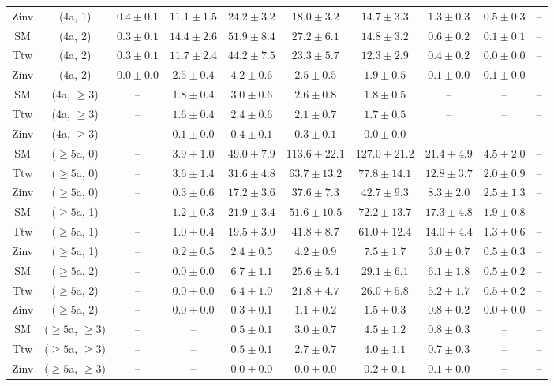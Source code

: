 \begin{table}[h!]
{\begin{tabular}{cccccccccc}
	Zinv & (4a, 1) & $0.4\pm 0.1$ & $11.1\pm 1.5$ & $24.2\pm 3.2$ & $18.0\pm 3.2$ & $14.7\pm 3.3$ & $1.3\pm 0.3$ & $0.5\pm 0.3$ & -- \\[0.5ex] 
	SM & (4a, 2) & $0.3\pm 0.1$ & $14.4\pm 2.6$ & $51.9\pm 8.4$ & $27.2\pm 6.1$ & $14.8\pm 3.2$ & $0.6\pm 0.2$ & $0.1\pm 0.1$ & -- \\[0.5ex] 
	Ttw & (4a, 2) & $0.3\pm 0.1$ & $11.7\pm 2.4$ & $44.2\pm 7.5$ & $23.3\pm 5.7$ & $12.3\pm 2.9$ & $0.4\pm 0.2$ & $0.0\pm 0.0$ & -- \\[0.5ex] 
	Zinv & (4a, 2) & $0.0\pm 0.0$ & $2.5\pm 0.4$ & $4.2\pm 0.6$ & $2.5\pm 0.5$ & $1.9\pm 0.5$ & $0.1\pm 0.0$ & $0.1\pm 0.0$ & -- \\[0.5ex] 
	SM & (4a, $\ge3$) & -- & $1.8\pm 0.4$ & $3.0\pm 0.6$ & $2.6\pm 0.8$ & $1.8\pm 0.5$ & -- & -- & -- \\[0.5ex] 
	Ttw & (4a, $\ge3$) & -- & $1.6\pm 0.4$ & $2.4\pm 0.6$ & $2.1\pm 0.7$ & $1.7\pm 0.5$ & -- & -- & -- \\[0.5ex] 
	Zinv & (4a, $\ge3$) & -- & $0.1\pm 0.0$ & $0.4\pm 0.1$ & $0.3\pm 0.1$ & $0.0\pm 0.0$ & -- & -- & -- \\[0.5ex] 
	SM & ($\ge5$a, 0) & -- & $3.9\pm 1.0$ & $49.0\pm 7.9$ & $113.6\pm 22.1$ & $127.0\pm 21.2$ & $21.4\pm 4.9$ & $4.5\pm 2.0$ & -- \\[0.5ex] 
	Ttw & ($\ge5$a, 0) & -- & $3.6\pm 1.4$ & $31.6\pm 4.8$ & $63.7\pm 13.2$ & $77.8\pm 14.1$ & $12.8\pm 3.7$ & $2.0\pm 0.9$ & -- \\[0.5ex] 
	Zinv & ($\ge5$a, 0) & -- & $0.3\pm 0.6$ & $17.2\pm 3.6$ & $37.6\pm 7.3$ & $42.7\pm 9.3$ & $8.3\pm 2.0$ & $2.5\pm 1.3$ & -- \\[0.5ex] 
	SM & ($\ge5$a, 1) & -- & $1.2\pm 0.3$ & $21.9\pm 3.4$ & $51.6\pm 10.5$ & $72.2\pm 13.7$ & $17.3\pm 4.8$ & $1.9\pm 0.8$ & -- \\[0.5ex] 
	Ttw & ($\ge5$a, 1) & -- & $1.0\pm 0.4$ & $19.5\pm 3.0$ & $41.8\pm 8.7$ & $61.0\pm 12.4$ & $14.0\pm 4.4$ & $1.3\pm 0.6$ & -- \\[0.5ex] 
	Zinv & ($\ge5$a, 1) & -- & $0.2\pm 0.5$ & $2.4\pm 0.5$ & $4.2\pm 0.9$ & $7.5\pm 1.7$ & $3.0\pm 0.7$ & $0.5\pm 0.3$ & -- \\[0.5ex] 
	SM & ($\ge5$a, 2) & -- & $0.0\pm 0.0$ & $6.7\pm 1.1$ & $25.6\pm 5.4$ & $29.1\pm 6.1$ & $6.1\pm 1.8$ & $0.5\pm 0.2$ & -- \\[0.5ex] 
	Ttw & ($\ge5$a, 2) & -- & $0.0\pm 0.0$ & $6.4\pm 1.0$ & $21.8\pm 4.7$ & $26.0\pm 5.8$ & $5.2\pm 1.7$ & $0.5\pm 0.2$ & -- \\[0.5ex] 
	Zinv & ($\ge5$a, 2) & -- & $0.0\pm 0.0$ & $0.3\pm 0.1$ & $1.1\pm 0.2$ & $1.5\pm 0.3$ & $0.8\pm 0.2$ & $0.0\pm 0.0$ & -- \\[0.5ex] 
	SM & ($\ge5$a, $\ge3$) & -- & -- & $0.5\pm 0.1$ & $3.0\pm 0.7$ & $4.5\pm 1.2$ & $0.8\pm 0.3$ & -- & -- \\[0.5ex] 
	Ttw & ($\ge5$a, $\ge3$) & -- & -- & $0.5\pm 0.1$ & $2.7\pm 0.7$ & $4.0\pm 1.1$ & $0.7\pm 0.3$ & -- & -- \\[0.5ex] 
	Zinv & ($\ge5$a, $\ge3$) & -- & -- & $0.0\pm 0.0$ & $0.0\pm 0.0$ & $0.2\pm 0.1$ & $0.1\pm 0.0$ & -- & -- \\[0.5ex] 
	\hline
	\hline
\end{tabular}}
\end{table}
